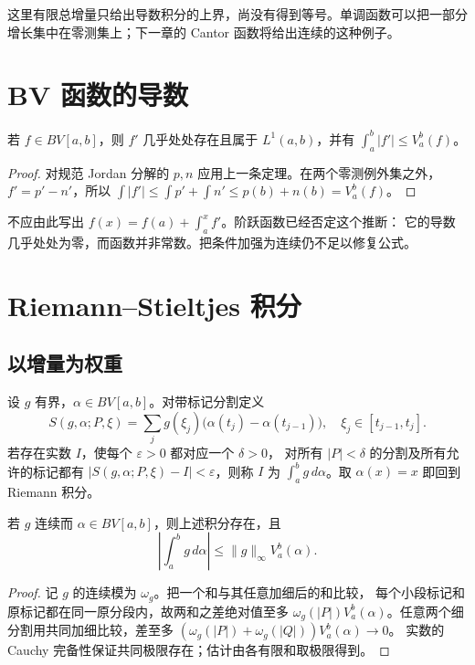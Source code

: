 这里有限总增量只给出导数积分的上界，尚没有得到等号。单调函数可以把一部分
增长集中在零测集上；下一章的 Cantor 函数将给出连续的这种例子。

\section{BV 函数的导数}

\begin{corollary}\label{cor:bv-derivative-integrable}
若 \(f\in BV[a,b]\)，则 \(f'\) 几乎处处存在且属于 \(L^1(a,b)\)，并有
\(\int_a^b|f'|\le V_a^b(f)\)。
\end{corollary}
\begin{proof}
对规范 Jordan 分解的 \(p,n\) 应用上一条定理。在两个零测例外集之外，
\(f'=p'-n'\)，所以
\(\int|f'|\le\int p'+\int n'\le p(b)+n(b)=V_a^b(f)\)。
\end{proof}

不应由此写出 \(f(x)=f(a)+\int_a^x f'\)。阶跃函数已经否定这个推断：
它的导数几乎处处为零，而函数并非常数。把条件加强为连续仍不足以修复公式。

\section{Riemann--Stieltjes 积分}

\subsection{以增量为权重}

设 \(g\) 有界，\(\alpha\in BV[a,b]\)。对带标记分割定义
\[
 S(g,\alpha;P,\xi)=\sum_jg(\xi_j)
       \bigl(\alpha(t_j)-\alpha(t_{j-1})\bigr),\quad
 \xi_j\in[t_{j-1},t_j].
\]
若存在实数 \(I\)，使每个 \(\varepsilon>0\) 都对应一个 \(\delta>0\)，
对所有 \(|P|<\delta\) 的分割及所有允许的标记都有
\(|S(g,\alpha;P,\xi)-I|<\varepsilon\)，则称 \(I\) 为
\(\int_a^b g\,d\alpha\)。取 \(\alpha(x)=x\) 即回到 Riemann 积分。

\begin{theorem}\label{thm:continuous-rs-integral}
若 \(g\) 连续而 \(\alpha\in BV[a,b]\)，则上述积分存在，且
\[
 \left|\int_a^b g\,d\alpha\right|\le\|g\|_\infty V_a^b(\alpha).
\]
\end{theorem}
\begin{proof}
记 \(g\) 的连续模为 \(\omega_g\)。把一个和与其任意加细后的和比较，
每个小段标记和原标记都在同一原分段内，故两和之差绝对值至多
\(\omega_g(|P|)V_a^b(\alpha)\)。任意两个细分割用共同加细比较，差至多
\((\omega_g(|P|)+\omega_g(|Q|))V_a^b(\alpha)\to0\)。
实数的 Cauchy 完备性保证共同极限存在；估计由各有限和取极限得到。
\end{proof}

